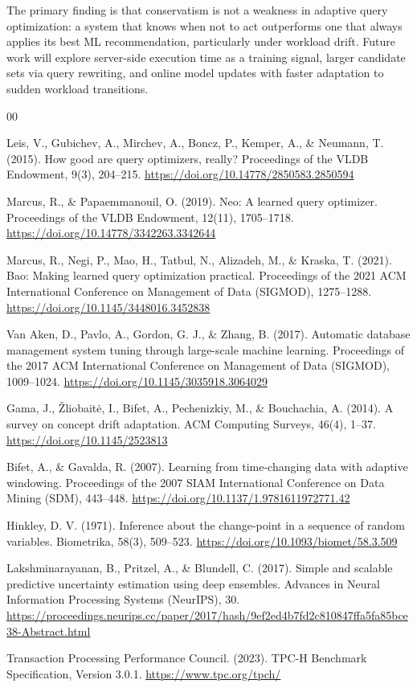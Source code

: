 \documentclass[conference]{IEEEtran}
\begin{document}
The primary finding is that conservatism is not a weakness in adaptive
query optimization: a system that knows when not to act outperforms one that
always applies its best ML recommendation, particularly under workload
drift. Future work will explore server-side execution time as a training
signal, larger candidate sets via query rewriting, and online model updates
with faster adaptation to sudden workload transitions.

\begin{thebibliography}{00}

 Leis, V., Gubichev, A., Mirchev, A., Boncz, P., Kemper, A., \&
Neumann, T. (2015). How good are query optimizers, really? Proceedings of the
VLDB Endowment, 9(3), 204--215.
\url{https://doi.org/10.14778/2850583.2850594}

 Marcus, R., \& Papaemmanouil, O. (2019). Neo: A learned query
optimizer. Proceedings of the VLDB Endowment, 12(11), 1705--1718.
\url{https://doi.org/10.14778/3342263.3342644}

 Marcus, R., Negi, P., Mao, H., Tatbul, N., Alizadeh, M., \&
Kraska, T. (2021). Bao: Making learned query optimization practical.
Proceedings of the 2021 ACM International Conference on Management of Data
(SIGMOD), 1275--1288.
\url{https://doi.org/10.1145/3448016.3452838}

 Van Aken, D., Pavlo, A., Gordon, G. J., \& Zhang, B. (2017).
Automatic database management system tuning through large-scale machine
learning. Proceedings of the 2017 ACM International Conference on Management
of Data (SIGMOD), 1009--1024.
\url{https://doi.org/10.1145/3035918.3064029}

 Gama, J., \v{Z}liobait\.{e}, I., Bifet, A., Pechenizkiy, M., \&
Bouchachia, A. (2014). A survey on concept drift adaptation. ACM Computing
Surveys, 46(4), 1--37.
\url{https://doi.org/10.1145/2523813}

 Bifet, A., \& Gavalda, R. (2007). Learning from time-changing
data with adaptive windowing. Proceedings of the 2007 SIAM International
Conference on Data Mining (SDM), 443--448.
\url{https://doi.org/10.1137/1.9781611972771.42}

 Hinkley, D. V. (1971). Inference about the change-point in a
sequence of random variables. Biometrika, 58(3), 509--523.
\url{https://doi.org/10.1093/biomet/58.3.509}

 Lakshminarayanan, B., Pritzel, A., \& Blundell, C. (2017).
Simple and scalable predictive uncertainty estimation using deep ensembles.
Advances in Neural Information Processing Systems (NeurIPS), 30.
\url{https://proceedings.neurips.cc/paper/2017/hash/9ef2ed4b7fd2c810847ffa5fa85bce38-Abstract.html}

 Transaction Processing Performance Council. (2023). TPC-H
Benchmark Specification, Version 3.0.1.
\url{https://www.tpc.org/tpch/}

\end{thebibliography}
\end{document}
